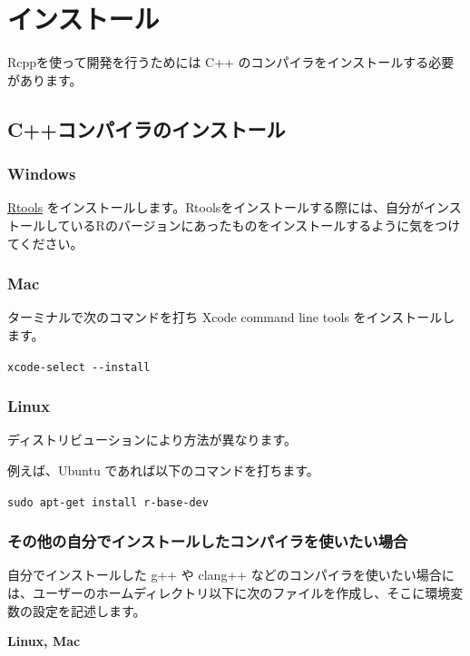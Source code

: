 \documentclass[]{book}
\begin{document}
\chapter{インストール}

Rcppを使って開発を行うためには C++ のコンパイラをインストールする必要があります。

\hypertarget{c}{%
\section{C++コンパイラのインストール}\label{c}}

\hypertarget{windows}{%
\subsection{Windows}\label{windows}}

\href{https://cran.r-project.org/bin/windows/Rtools/index.html}{Rtools} をインストールします。Rtoolsをインストールする際には、自分がインストールしているRのバージョンにあったものをインストールするように気をつけてください。

\hypertarget{mac}{%
\subsection{Mac}\label{mac}}

ターミナルで次のコマンドを打ち Xcode command line tools をインストールします。

\texttt{xcode-select\ -\/-install}

\hypertarget{linux}{%
\subsection{Linux}\label{linux}}

ディストリビューションにより方法が異なります。

例えば、Ubuntu であれば以下のコマンドを打ちます。

\texttt{sudo\ apt-get\ install\ r-base-dev}

\subsection{その他の自分でインストールしたコンパイラを使いたい場合}

自分でインストールした g++ や clang++ などのコンパイラを使いたい場合には、ユーザーのホームディレクトリ以下に次のファイルを作成し、そこに環境変数の設定を記述します。

\textbf{Linux, Mac}
\end{document}
